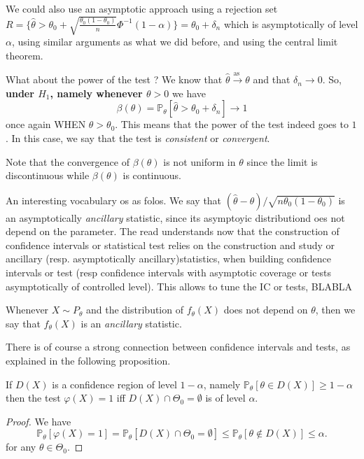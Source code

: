 \documentclass[
	fontsize=11pt, %
	twoside=false, %
	numbers=noenddot, %
]{kaobook}
\renewcommand{\P}{\mathbb P}
\newcommand{\wh}{\widehat}
\newcommand{\go}{\rightarrow}
\newcommand{\goas}{\overset{\text{as\ }}{\rightarrow}}
\begin{document}
We could also use an asymptotic approach using a rejection set $R = \{ \wh \theta > \theta_0  + \sqrt{\frac{\theta_0 (1 - \theta_0)}{n}} \Phi^{-1}(1 - \alpha) \} = \theta_0 + \delta_n$ which is asymptotically of level $\alpha$, using similar arguments as what we did before, and using the central limit theorem.

What about the power of the test ?
We know that $\wh \theta \goas \theta$ and that $\delta_n \go 0$.
So, \textbf{under $H_1$, namely whenever $\theta > 0$} we have
\begin{equation*}
	\beta(\theta) = \P_\theta[ \wh \theta > \theta_0 + \delta_n] \go 1
\end{equation*}
once again WHEN $\theta > \theta_0$.
This means that the power of the test indeed goes to $1$.
In this case, we say that the test is \emph{consistent} or \emph{convergent}.

\begin{remark}
 	Note that the convergence of $\beta(\theta)$ is not uniform in $\theta$ since the limit is discontinuous while $\beta(\theta)$ is continuous.
\end{remark}

An interesting vocabulary os as folos.
We say that $(\wh \theta - \theta) / \sqrt{n \theta_0(1 - \theta_0)}$ is an asymptotically \emph{ancillary} statistic, since its asymptoyic distributiond oes not depend on the parameter.
The read understands now that the construction of confidence intervals or statistical test relies on the construction and study or ancillary (resp. asymptotically ancillary)statistics, when building confidence intervals or test (resp confidence intervals with asymptotic coverage or tests asymptotically of controlled level).
This allows to tune the IC or tests, BLABLA

Whenever $X \sim P_\theta$ and the distribution of $f_\theta(X)$ does not depend on $\theta$, then we say that $f_\theta(X)$ is an \emph{ancillary} statistic.


There is of course a strong connection between confidence intervals and tests, as explained in the following proposition.
\begin{proposition}
	If $D(X)$ is a confidence region of level $1 - \alpha$, namely $\P_\theta[ \theta \in D(X)] \geq 1 - \alpha$ then the test $\varphi(X) = 1$ iff $D(X) \cap \Theta_0  = \emptyset$ is of level $\alpha$.
\end{proposition}
\begin{proof}
	We have
	\begin{equation*}
		\P_\theta [\varphi(X) = 1] = \P_\theta[ D(X) \cap \Theta_0 = \emptyset] \leq \P_\theta[ \theta \notin D(X) ] \leq \alpha.
	\end{equation*}
	for any $\theta \in \Theta_0$.
\end{proof}
\end{document}
